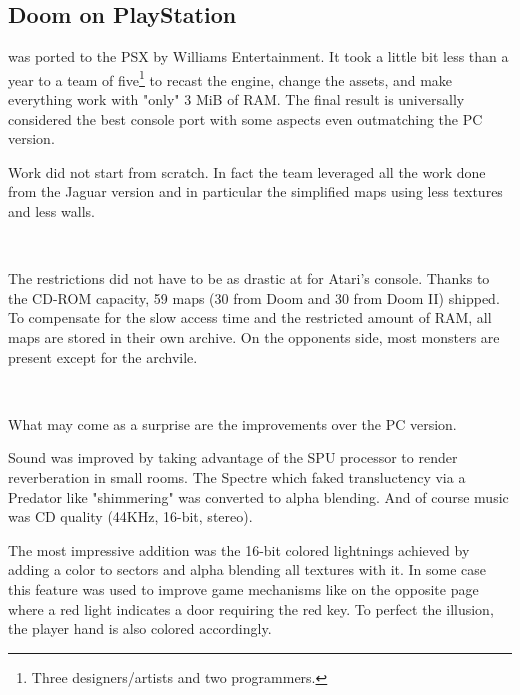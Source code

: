 \subsection{Doom on PlayStation}
\doom was ported to the PSX by Williams Entertainment. It took a little bit less than a year to a team of five\footnote{Three designers/artists and two programmers.} to recast the engine, change the assets, and make everything work with "only" 3 MiB of RAM. The final result is universally considered the best console port with some aspects even outmatching the PC version.\\
\par
Work did not start from scratch. In fact the team leveraged all the work done from the Jaguar version and in particular the simplified maps using less textures and less walls.\\
\par
{}\\
\par
  The restrictions did not have to be as drastic at for Atari's console. Thanks to the CD-ROM capacity, 59 maps (30 from Doom and 30 from Doom II) shipped. To compensate for the slow access time and the restricted amount of RAM, all maps are stored in their own  archive. On the opponents side, most monsters are present except for the archvile.\\
\par
{}\\
\par
What may come as a surprise are the improvements over the PC version.\\
\par
Sound was improved by taking advantage of the SPU processor to render reverberation in small rooms. The Spectre which faked transluctency via a Predator like  "shimmering" was converted to alpha blending. And of course music was CD quality (44KHz, 16-bit, stereo).\\
\par
 The most impressive addition was the 16-bit colored lightnings achieved by adding a color to sectors and alpha blending all textures with it. In some case this feature was used to improve game mechanisms like on the opposite page where a red light indicates a door requiring the red key. To perfect the illusion, the player hand is also colored accordingly.\\
\par


